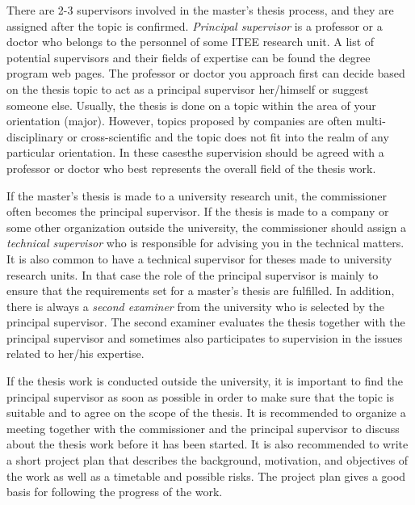 There are 2-3 supervisors involved in the master’s thesis process, and they are assigned after the topic is confirmed. \textit{Principal supervisor} is a professor or a doctor who belongs to the personnel of some ITEE research unit. A list of potential supervisors and their fields of expertise can be found \DIFdelbegin {}\DIFdelend \DIFaddbegin {}\DIFaddend the degree program web pages\DIFaddbegin \DIFadd{~}\DIFaddend \cite{mscstudies}. The professor or doctor you approach first can decide based on the thesis topic to act as a principal supervisor her/himself or suggest someone else.  Usually, the thesis is done on a topic within the area of your orientation (major).  However, topics proposed by companies are often multi-disciplinary or cross-scientific  and the topic does not fit into the realm of any particular orientation. In these cases\DIFaddbegin \DIFadd{, }\DIFaddend the supervision should be agreed with a professor or doctor who best represents the overall field of the thesis work.

If the master’s thesis is made to a university research unit, the commissioner often becomes the principal supervisor. If the thesis is made to a company or some other organization outside the university, the commissioner should assign a \textit{technical supervisor} who is responsible for advising you in the technical matters. It is also common to have a technical supervisor for theses made to university research units. In that case the role of the principal supervisor is mainly to ensure that the requirements set for a master’s thesis are fulfilled. In addition, there is always a \textit{second examiner} from the university who is selected by the principal supervisor. The second examiner evaluates the thesis together with the principal supervisor and sometimes also participates to supervision in the issues related to her/his expertise.

If the thesis work is conducted outside the university, it is important to find the principal supervisor as soon as possible in order to make sure that the topic is suitable and to agree on the scope of the thesis. It is recommended to organize a meeting together with the commissioner and the principal supervisor to discuss about the thesis work before it has been started. It is also recommended to write a short project plan that describes the background, motivation, and objectives of the work as well as a timetable and possible risks. The project plan gives a good basis for following the progress of the work.

